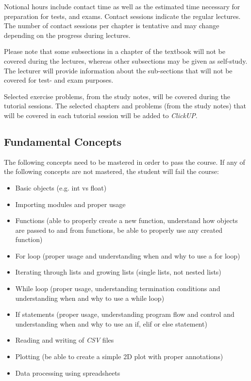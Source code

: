         Notional hours include contact time as well as the estimated time
        necessary for preparation for tests, and exams. Contact sessions
        indicate the regular lectures. The number of contact sessions per
        chapter is tentative and may change depending on the progress during
        lectures.

        Please note that some subsections in a chapter of the textbook will not
        be covered during the lectures, whereas other subsections may be given
        as self-study. The lecturer will provide information about the
        sub-sections that will not be covered for test- and exam purposes.

        Selected exercise problems, from the study notes, will be covered
        during the tutorial sessions. The selected chapters and problems (from
        the study notes) that will be covered in each tutorial session will be
        added to {\it ClickUP}.

    \subsection{Fundamental Concepts}
        The following concepts need to be mastered in order to pass the course.
        If any of the following concepts are not mastered, the student will
        fail the course:
        \begin{itemize}
            \item Basic objects (e.g. int vs float)
            \item Importing modules and proper usage
            \item Functions (able to properly create a new function, understand
                how objects are passed to and from functions, be able to
                properly use any created function)
            \item For loop (proper usage and understanding when and why to use
                a for loop)
            \item Iterating through lists and growing lists (single lists, not
                nested lists)
            \item While loop (proper usage, understanding termination
                conditions and understanding when and why to use a while loop)
            \item If statements (proper usage, understanding program flow and
                control and understanding when and why to use an if, elif or
                else statement)
            \item Reading and writing of {\it CSV} files
            \item Plotting (be able to create a simple 2D plot with proper
                annotations)
            \item Data processing using spreadsheets
        \end{itemize}

